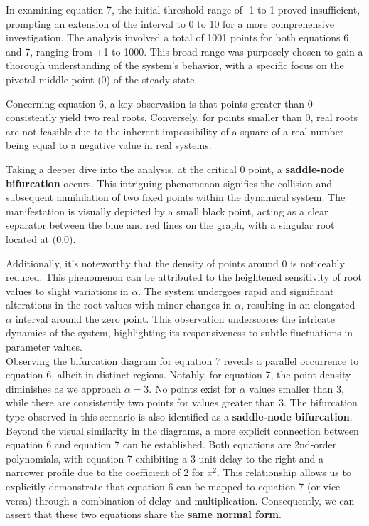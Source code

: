 In examining equation 7, the initial threshold range of -1 to 1 proved insufficient, prompting an extension of the interval to 0 to 10 for a more comprehensive investigation. The analysis involved a total of 1001 points for both equations 6 and 7, ranging from +1 to 1000. This broad range was purposely chosen to gain a thorough understanding of the system's behavior, with a specific focus on the pivotal middle point (0) of the steady state.

Concerning equation 6, a key observation is that points greater than 0 consistently yield two real roots. Conversely, for points smaller than 0, real roots are not feasible due to the inherent impossibility of a square of a real number being equal to a negative value in real systems.

Taking a deeper dive into the analysis, at the critical 0 point, a \textbf{saddle-node bifurcation} occurs. This intriguing phenomenon signifies the collision and subsequent annihilation of two fixed points within the dynamical system. The manifestation is visually depicted by a small black point, acting as a clear separator between the blue and red lines on the graph, with a singular root located at (0,0).

Additionally, it's noteworthy that the density of points around 0 is noticeably reduced. This phenomenon can be attributed to the heightened sensitivity of root values to slight variations in $\alpha$. The system undergoes rapid and significant alterations in the root values with minor changes in $\alpha$, resulting in an elongated $\alpha$ interval around the zero point. This observation underscores the intricate dynamics of the system, highlighting its responsiveness to subtle fluctuations in parameter values. \\

Observing the bifurcation diagram for equation 7 reveals a parallel occurrence to equation 6, albeit in distinct regions. Notably, for equation 7, the point density diminishes as we approach $\alpha=3$. No points exist for $\alpha$ values smaller than 3, while there are consistently two points for values greater than 3. The bifurcation type observed in this scenario is also identified as a \textbf{saddle-node bifurcation}. \\

Beyond the visual similarity in the diagrams, a more explicit connection between equation 6 and equation 7 can be established. Both equations are 2nd-order polynomials, with equation 7 exhibiting a 3-unit delay to the right and a narrower profile due to the coefficient of 2 for $x^2$. This relationship allows us to explicitly demonstrate that equation 6 can be mapped to equation 7 (or vice versa) through a combination of delay and multiplication. Consequently, we can assert that these two equations share the \textbf{same normal form}.

